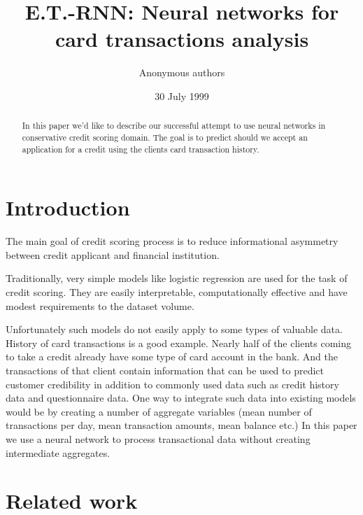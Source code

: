 \documentclass[sigconf]{acmart}
\begin{document}
\title{E.T.-RNN: Neural networks for card transactions analysis}

\author{Anonymous authors}

\date{30 July 1999}

\begin{abstract}
In this paper we'd like to describe our successful attempt to use neural networks in conservative credit scoring domain.
The goal is to predict should we accept an application for a credit using the clients card transaction history.
\end{abstract}

\maketitle

\section{Introduction}

The main goal of credit scoring process is to reduce informational asymmetry between credit applicant and financial institution.

Traditionally, very simple models like logistic regression are used for the task of credit scoring. They are easily interpretable, computationally effective and have modest requirements to the dataset volume.

Unfortunately such models do not easily apply to some types of valuable data. History of card transactions is a good example. Nearly half of the clients coming to take a credit already have some type of card account in the bank. And the transactions of that client contain information that can be used to predict customer credibility in addition to commonly used data such as credit history data and questionnaire data. One way to integrate such data into existing models would be by creating a number of aggregate variables (mean number of transactions per day, mean transaction amounts, mean balance etc.) In this paper we use a neural network to process transactional data without creating intermediate aggregates.

\section{Related work} \label{sec-rw}
\end{document}
